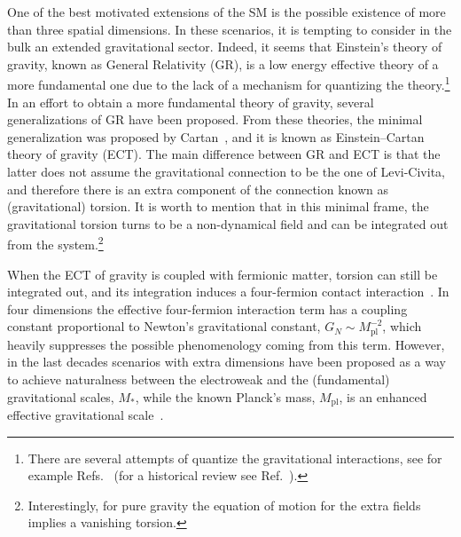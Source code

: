 \documentclass{ws-mpla}
\renewcommand{\(}{\left(}
\renewcommand{\)}{\right)}
\renewcommand{\[}{\left[}
\renewcommand{\]}{\right]}
\begin{document}
One of the best motivated extensions of the SM is the possible existence of more than three spatial dimensions. In these scenarios, it is tempting to consider in the bulk an extended gravitational sector. Indeed, it seems that Einstein's theory of gravity, known as General Relativity (GR), is a low energy effective theory of a more fundamental one due to the lack of a mechanism for quantizing the theory.\footnote{There are several attempts of quantize the gravitational interactions, see for example Refs.~ (for a historical review see Ref.~).} In an effort to obtain a more fundamental theory of gravity, several generalizations of GR have been proposed. From these theories, the minimal generalization was proposed by Cartan~\cite{Cartan-Einstein,Cartan1922,Cartan1923,Cartan1924,Cartan1925}, and it is known as Einstein--Cartan theory of gravity (ECT). The main difference between GR and ECT is that the latter does not assume the gravitational connection to be the one of Levi-Civita, and therefore there is an extra component of the connection known as (gravitational) torsion. It is worth to mention that in this minimal frame, the gravitational torsion turns to be a non-dynamical field and can be integrated out from the system.\footnote{Interestingly, for pure gravity the equation of motion for the extra fields implies a vanishing torsion.}

When the ECT of gravity is coupled with fermionic matter, torsion can still be integrated out, and its integration induces a four-fermion contact interaction~\cite{Kibble:1961ba,Hehl:1976kj,Shapiro:2001rz,Hammond:2002rm,SUGRA-book}. In four dimensions the effective four-fermion interaction term has a coupling constant proportional to Newton's gravitational constant, $G_N\sim M_{\text{pl}}^{-2}$, which heavily suppresses the possible phenomenology coming from this term.
However, in the last decades scenarios with extra dimensions have been proposed as a way to achieve naturalness between the electroweak and the (fundamental) gravitational scales, $M_*$, while the known Planck's mass, $M_{\text{pl}}$, is an enhanced effective gravitational scale~\cite{ADD1,AADD,ADD2,RS1,RS2}.
\end{document}
